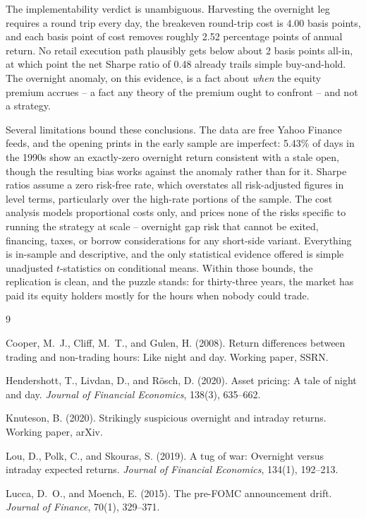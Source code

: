 \documentclass[11pt]{article}
\begin{document}
The implementability verdict is unambiguous. Harvesting the overnight leg requires a round trip every day, the breakeven round-trip cost is 4.00 basis points, and each basis point of cost removes roughly 2.52 percentage points of annual return. No retail execution path plausibly gets below about 2 basis points all-in, at which point the net Sharpe ratio of 0.48 already trails simple buy-and-hold. The overnight anomaly, on this evidence, is a fact about \emph{when} the equity premium accrues -- a fact any theory of the premium ought to confront -- and not a strategy.

Several limitations bound these conclusions. The data are free Yahoo Finance feeds, and the opening prints in the early sample are imperfect: 5.43\% of days in the 1990s show an exactly-zero overnight return consistent with a stale open, though the resulting bias works against the anomaly rather than for it. Sharpe ratios assume a zero risk-free rate, which overstates all risk-adjusted figures in level terms, particularly over the high-rate portions of the sample. The cost analysis models proportional costs only, and prices none of the risks specific to running the strategy at scale -- overnight gap risk that cannot be exited, financing, taxes, or borrow considerations for any short-side variant. Everything is in-sample and descriptive, and the only statistical evidence offered is simple unadjusted $t$-statistics on conditional means. Within those bounds, the replication is clean, and the puzzle stands: for thirty-three years, the market has paid its equity holders mostly for the hours when nobody could trade.

\begin{thebibliography}{9}

Cooper, M.~J., Cliff, M.~T., and Gulen, H. (2008).
Return differences between trading and non-trading hours: Like night and day.
Working paper, SSRN.

Hendershott, T., Livdan, D., and R\"osch, D. (2020).
Asset pricing: A tale of night and day.
\emph{Journal of Financial Economics}, 138(3), 635--662.

Knuteson, B. (2020).
Strikingly suspicious overnight and intraday returns.
Working paper, arXiv.

Lou, D., Polk, C., and Skouras, S. (2019).
A tug of war: Overnight versus intraday expected returns.
\emph{Journal of Financial Economics}, 134(1), 192--213.

Lucca, D.~O., and Moench, E. (2015).
The pre-FOMC announcement drift.
\emph{Journal of Finance}, 70(1), 329--371.

\end{thebibliography}
\end{document}
